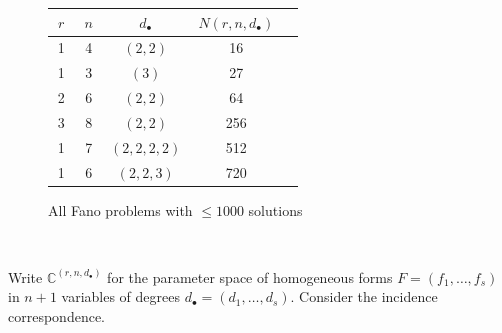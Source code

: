 \documentclass[final]{beamer}
\theoremstyle{thrm}
\newcommand{\headft}[1]{
\begin{center}
\underline{\quad{\LARGE \color{black!50!blue!50}{#1}}\quad}
\end{center}
}
\newcommand{\tallminipage}{\begin{minipage}{.025\textwidth}~\vspace{0pt}~\end{minipage}}
\begin{document}
\begin{frame}
\begin{minipage}[t]{.3\textwidth}


\vspace{.8cm}

\begin{figure}
\begin{minipage}{.99\textwidth}
\begin{table}[htb]
  \label{Small Fano}
  \def\arraystretch{1.2}
  \begin{tabular}{||c|c|c|c|c||}
    \hline
    $~r~$ & $~n~$ & $~d_\bullet~$ & $~N(r,n,d_\bullet)~$\\
    \hline\hline
    1 & 4 & $(2,2)$ & 16\\
    \hline
    1 & 3 & $(3)$ & 27\\
    \hline
    2 & 6 & $(2,2)$ & 64\\
    \hline
    3 & 8 & $(2,2)$ & 256\\
    \hline
    1 & 7 & $(2,2,2,2)$ & 512\\
    \hline
    1 & 6 & $(2,2,3)$ & 720\\
    \hline
  \end{tabular}
\end{table}
\end{minipage}
\caption{All Fano problems with $\le 1000$ solutions}
\end{figure}
\end{minipage}
%
\tallminipage
\begin{minipage}[t]{.3\textwidth}
\headft{Galois groups of Fano problems}
Write $\mathbb{C}^{(r,n,d_\bullet)}$ for the parameter space of homogeneous forms $F = (f_1,\dotsc,f_s)$ in $n+1$ variables of degrees $d_\bullet = (d_1,\dotsc,d_s)$. Consider the incidence correspondence.

\vspace{-1cm}

\begin{center}
\end{center}


\end{minipage}
\end{frame}
\end{document}
